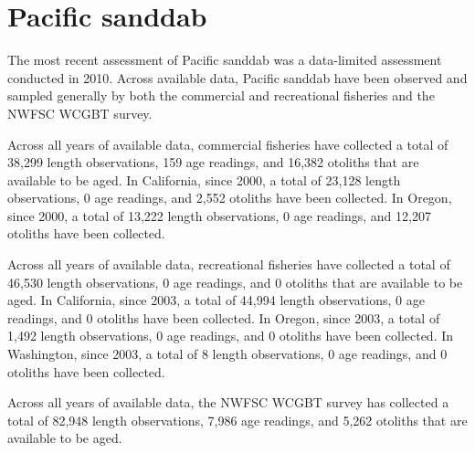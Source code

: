 \documentclass[11pt,
  english,
  letterpaper,
]{article}
\begin{document}

\hypertarget{pacific-sanddab}{%
\section{Pacific sanddab}\label{pacific-sanddab}}

\leavevmode\tagmcend\tagstructend


The most recent assessment of Pacific sanddab was a data-limited assessment conducted in 2010. Across available data, Pacific sanddab have been observed and sampled generally by both the commercial and recreational fisheries and the NWFSC WCGBT survey.

\leavevmode\tagmcend\tagstructend\par


Across all years of available data, commercial fisheries have collected a total of 38,299 length observations, 159 age readings, and 16,382 otoliths that are available to be aged. In California, since 2000, a total of 23,128 length observations, 0 age readings, and 2,552 otoliths have been collected. In Oregon, since 2000, a total of 13,222 length observations, 0 age readings, and 12,207 otoliths have been collected.

\leavevmode\tagmcend\tagstructend\par


Across all years of available data, recreational fisheries have collected a total of 46,530 length observations, 0 age readings, and 0 otoliths that are available to be aged. In California, since 2003, a total of 44,994 length observations, 0 age readings, and 0 otoliths have been collected. In Oregon, since 2003, a total of 1,492 length observations, 0 age readings, and 0 otoliths have been collected. In Washington, since 2003, a total of 8 length observations, 0 age readings, and 0 otoliths have been collected.

\leavevmode\tagmcend\tagstructend\par


Across all years of available data, the NWFSC WCGBT survey has collected a total of 82,948 length observations, 7,986 age readings, and 5,262 otoliths that are available to be aged.
\end{document}
